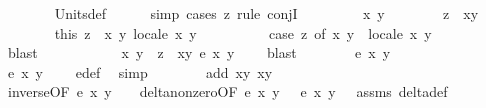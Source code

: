 \begin{isabellebody}
\ \ \ \ \ \ \isamarkupfalse%
\ Units{\isacharunderscore}def\ \isanewline
\ \ \ \ \isamarkupfalse%
{\isacharparenleft}simp{\isacharcomma}\ cases\ {\isachardoublequoteopen}z{\isachardoublequoteclose}{\isacharcomma}\ rule\ conjI{\isacharparenright}\ \isanewline
\ \ \ \ \ \ \isamarkupfalse%
\ x\ y\isanewline
\ \ \ \ \ \ \isamarkupfalse%
\ {\isachardoublequoteopen}z\ {\isacharequal}\ {\isacharparenleft}x{\isacharcomma}y{\isacharparenright}{\isachardoublequoteclose}\ \isanewline
\ \ \ \ \ \ \isamarkupfalse%
\ this\ {\isacartoucheopen}z\ {\isasymin}\ {\isacharbraceleft}{\isacharparenleft}x{\isacharcomma}\ y{\isacharparenright}{\isachardot}\ local{\isachardot}e\ x\ y\ {\isacharequal}\ {}{\isacharbraceright}{\isacartoucheclose}\isanewline
\ \ \ \ \ \ \isamarkupfalse%
\ {\isachardoublequoteopen}case\ z\ of\ {\isacharparenleft}x{\isacharcomma}\ y{\isacharparenright}\ {\isasymRightarrow}\ local{\isachardot}e\ x\ y\ {\isacharequal}\ {}{\isachardoublequoteclose}\ \isamarkupfalse%
\ blast\ \ \isanewline
\ \ \ \ \ \ \isamarkupfalse%
\ \isamarkupfalse%
\ x\ y\ \ {\isachardoublequoteopen}z\ {\isacharequal}\ {\isacharparenleft}x{\isacharcomma}y{\isacharparenright}{\isachardoublequoteclose}\ {\isachardoublequoteopen}e\ x\ y\ {\isacharequal}\ {}{\isachardoublequoteclose}\ \isamarkupfalse%
\ blast\isanewline
\ \ \ \ \ \ \isamarkupfalse%
\ {\isachardoublequoteopen}e\ x\ {\isacharparenleft}{\isacharminus}y{\isacharparenright}\ {\isacharequal}\ {}{\isachardoublequoteclose}\ \isanewline
\ \ \ \ \ \ \ \ \isamarkupfalse%
\ {\isacartoucheopen}e\ x\ y\ {\isacharequal}\ {}{\isacartoucheclose}\ \isamarkupfalse%
\ e{\isacharunderscore}def\ \isamarkupfalse%
\ simp\isanewline
\ \ \ \ \ \ \isamarkupfalse%
\ {\isachardoublequoteopen}add\ {\isacharparenleft}x{\isacharcomma}y{\isacharparenright}\ {\isacharparenleft}x{\isacharcomma}{\isacharminus}y{\isacharparenright}\ {\isacharequal}\ {\isacharparenleft}{}{\isacharcomma}{}{\isacharparenright}{\isachardoublequoteclose}\ \isanewline
\ \ \ \ \ \ \ \ \isamarkupfalse%
\ inverse{\isacharbrackleft}OF\ {\isacartoucheopen}e\ x\ y\ {\isacharequal}\ {}{\isacartoucheclose}\ {\isacharbrackright}\ delta{\isacharunderscore}non{\isacharunderscore}zero{\isacharbrackleft}OF\ {\isacartoucheopen}e\ x\ y\ {\isacharequal}\ {}{\isacartoucheclose}\ {\isacartoucheopen}e\ x\ y\ {\isacharequal}\ {}{\isacartoucheclose}\ assms{\isacharbrackright}\ delta{\isacharunderscore}def\ \isamarkupfalse%

\end{isabellebody}
